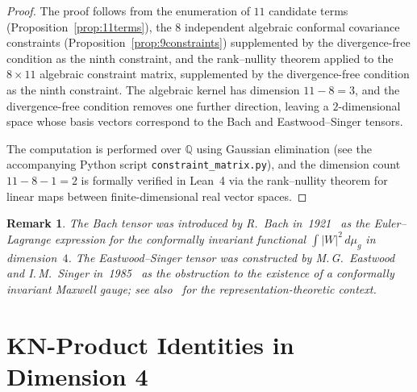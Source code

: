 \documentclass[11pt,a4paper]{article}
\newtheorem{remark}[theorem]{Remark}
\begin{document}
\begin{proof}
The proof follows from the enumeration of $11$ candidate terms
(Proposition~\ref{prop:11terms}), the $8$ independent algebraic conformal
covariance constraints (Proposition~\ref{prop:9constraints}) supplemented
by the divergence-free condition as the ninth constraint, and the
rank--nullity theorem applied to the $8 \times 11$ algebraic constraint
matrix, supplemented by the divergence-free condition as the ninth
constraint. The algebraic kernel has dimension $11 - 8 = 3$, and the
divergence-free condition removes one further direction, leaving a
$2$-dimensional space whose basis vectors correspond to the Bach and
Eastwood--Singer tensors.

The computation is performed over $\mathbb{Q}$ using Gaussian elimination
(see the accompanying Python script \texttt{constraint\_matrix.py}), and the
dimension count $11 - 8 - 1 = 2$ is formally verified in Lean~4 via the
rank--nullity theorem for linear maps between finite-dimensional
real vector spaces.
\end{proof}

\begin{remark}
The Bach tensor was introduced by R.~Bach in~1921~\cite{bach1921}
as the Euler--Lagrange expression for the conformally invariant
functional $\int |W|^2\,d\mu_g$ in dimension~$4$.
The Eastwood--Singer tensor was constructed
by M.\,G.\ Eastwood and I.\,M.\ Singer in~1985~\cite{eastwood-singer1985}
as the obstruction to the existence of a conformally invariant Maxwell
gauge; see also~\cite{eastwood-slovak1997} for the representation-theoretic
context.
\end{remark}

\section{KN-Product Identities in Dimension 4}
\label{sec:identities}
\end{document}

